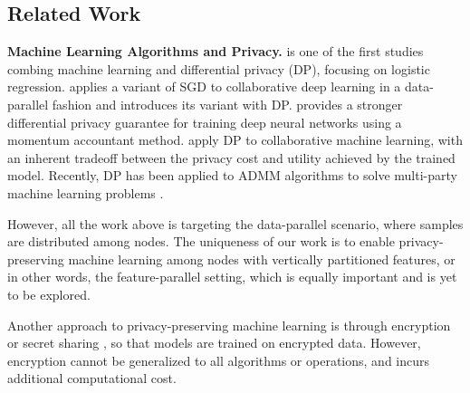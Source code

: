 \subsection{Related Work}
{\bf Machine Learning Algorithms and Privacy.} \cite{chaudhuri2009privacy}
is one of the first studies combing machine learning and differential privacy (DP), focusing on logistic regression. \cite{shokri2015privacy} applies a variant of SGD to collaborative deep learning in a data-parallel fashion and introduces its variant with DP. \cite{abadi2016deep} provides a stronger differential privacy guarantee for training deep neural networks using a momentum accountant method. \cite{pathak2010multiparty,rajkumar2012differentially} apply DP to collaborative machine learning, with an inherent tradeoff between the privacy cost and utility achieved by the trained model. Recently, DP has been applied to ADMM algorithms to solve multi-party machine learning problems \cite{zhang2018improving,zhang2016dual,zhang2019admm,zhang2017dynamic}. 

However, all the work above is targeting the data-parallel scenario, where samples are distributed among nodes. The uniqueness of our work is to enable privacy-preserving machine learning among nodes with vertically partitioned features, or in other words, the feature-parallel setting, which is equally important and is yet to be explored. 

Another approach to privacy-preserving machine learning is through
encryption \cite{gilad2016cryptonets,takabi2016privacy,kikuchi2018privacy} or secret sharing \cite{mohassel2017secureml,wan2007privacy,bonte2018privacy}, so that models are trained on encrypted data. However, encryption cannot be generalized to all algorithms or operations, and incurs additional computational cost.

